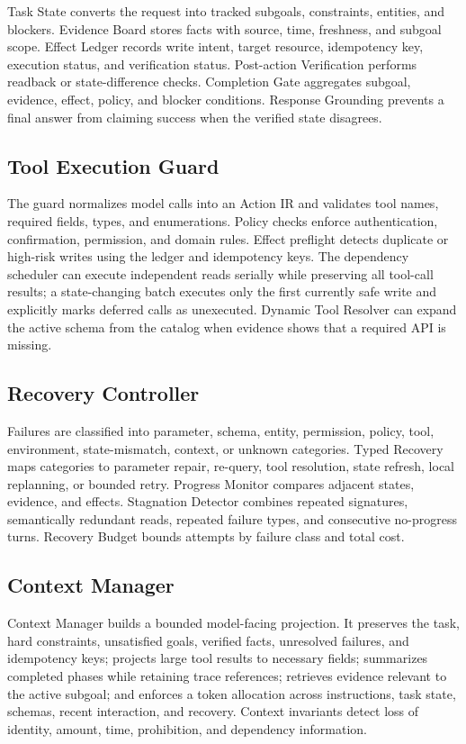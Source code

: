 \documentclass[10pt]{article}
\begin{document}
Task State converts the request into tracked subgoals, constraints, entities, and
blockers. Evidence Board stores facts with source, time, freshness, and subgoal
scope. Effect Ledger records write intent, target resource, idempotency key,
execution status, and verification status. Post-action Verification performs
readback or state-difference checks. Completion Gate aggregates subgoal, evidence,
effect, policy, and blocker conditions. Response Grounding prevents a final answer
from claiming success when the verified state disagrees.

\subsection{Tool Execution Guard}

The guard normalizes model calls into an Action IR and validates tool names,
required fields, types, and enumerations. Policy checks enforce authentication,
confirmation, permission, and domain rules. Effect preflight detects duplicate or
high-risk writes using the ledger and idempotency keys. The dependency scheduler
can execute independent reads serially while preserving all tool-call results; a
state-changing batch executes only the first currently safe write and explicitly
marks deferred calls as unexecuted. Dynamic Tool Resolver can expand the active
schema from the catalog when evidence shows that a required API is missing.

\subsection{Recovery Controller}

Failures are classified into parameter, schema, entity, permission, policy, tool,
environment, state-mismatch, context, or unknown categories. Typed Recovery maps
categories to parameter repair, re-query, tool resolution, state refresh, local
replanning, or bounded retry. Progress Monitor compares adjacent states, evidence,
and effects. Stagnation Detector combines repeated signatures, semantically
redundant reads, repeated failure types, and consecutive no-progress turns.
Recovery Budget bounds attempts by failure class and total cost.

\subsection{Context Manager}

Context Manager builds a bounded model-facing projection. It preserves the task,
hard constraints, unsatisfied goals, verified facts, unresolved failures, and
idempotency keys; projects large tool results to necessary fields; summarizes
completed phases while retaining trace references; retrieves evidence relevant to
the active subgoal; and enforces a token allocation across instructions, task
state, schemas, recent interaction, and recovery. Context invariants detect loss of
identity, amount, time, prohibition, and dependency information.
\end{document}
